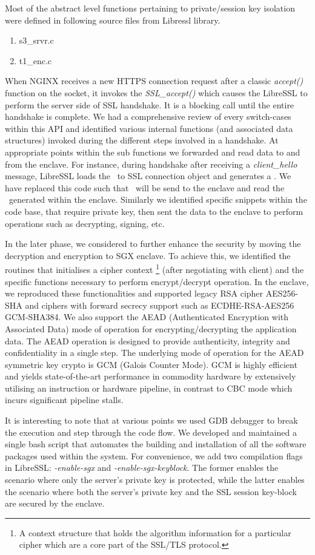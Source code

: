 \documentclass[../main.tex]{subfiles}
\begin{document}
Most of the abstract level functions pertaining to private/session key
isolation were defined in following source files from Libressl
library.
\begin{enumerate}
  \item s3\_srvr.c
  \item t1\_enc.c
\end{enumerate}
 
When NGINX receives a new HTTPS connection request after a classic
\textit{accept()} function on the socket, it invokes the
\textit{SSL\_accept()} which causes the LibreSSL to perform the server
side of SSL handshake. It is a blocking call until the entire
handshake is complete. We had a comprehensive review of every
switch-cases within this API and identified various internal functions
(and associated data structures) invoked during the different steps
involved in a handshake. At appropriate points within the sub
functions we forwarded and read data to and from the enclave. For
instance, during handshake after receiving a \textit{client\_hello}
message, LibreSSL loads the \crandom~to SSL connection object and
generates a \srandom. We have replaced this code such that
\crandom~will be send to the enclave and read the \srandom~generated
within the enclave. Similarly we identified specific snippets within
the code base, that require private key, then sent the data to the
enclave to perform operations such as decrypting, signing, etc.

In the later phase, we considered to further enhance the security by
moving the decryption and encryption to SGX enclave. To achieve this,
we identified the routines that initialises a cipher context
\footnote{A context structure that holds the algorithm information for
  a particular cipher which are a core part of the SSL/TLS protocol.}
(after negotiating with client) and the specific functions necessary
to perform encrypt/decrypt operation. In the enclave, we reproduced
these functionalities and supported legacy RSA cipher AES256-SHA and
ciphers with forward secrecy support such as ECDHE-RSA-AES256
GCM-SHA384. We also support the AEAD (Authenticated Encryption with
Associated Data) mode of operation for encrypting/decrypting the
application data. The AEAD operation is designed to provide
authenticity, integrity and confidentiality in a single step. The
underlying mode of operation for the AEAD symmetric key crypto is GCM
(Galois Counter Mode). GCM is highly efficient and yields
state-of-the-art performance in commodity hardware by extensively
utilising an instruction or hardware pipeline, in contrast to CBC mode
which incurs significant pipeline stalls.

It is interesting to note that at various points we used GDB debugger
to break the execution and step through the code flow. We developed
and maintained a single bash script that automates the building and
installation of all the software packages used within the system. For
convenience, we add two compilation flags in LibreSSL:
\textit{-enable-sgx} and \textit{-enable-sgx-keyblock}. The former
enables the scenario where only the server's private key is protected,
while the latter enables the scenario where both the server's private
key and the SSL session key-block are secured by the enclave.
\end{document}
